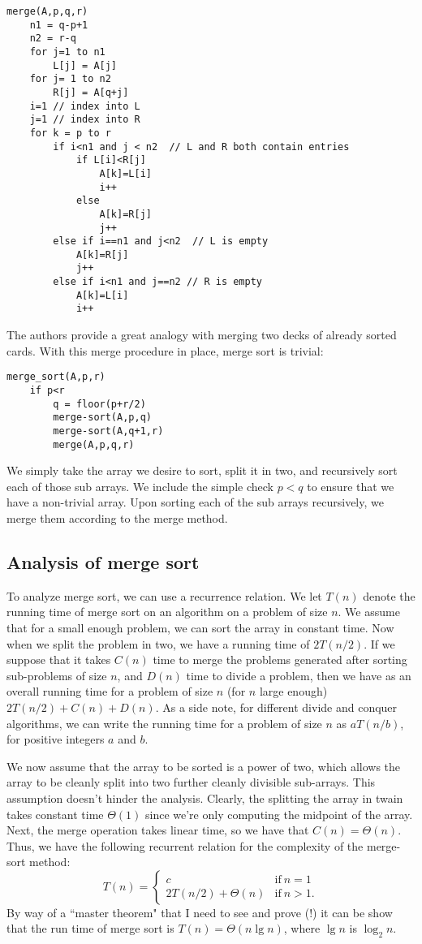 \documentclass[12pt,english]{article}
\begin{document}
\begin{lstlisting}
merge(A,p,q,r)
	n1 = q-p+1
	n2 = r-q
	for j=1 to n1
		L[j] = A[j]
	for j= 1 to n2
		R[j] = A[q+j]
	i=1 // index into L
	j=1 // index into R
	for k = p to r
		if i<n1 and j < n2  // L and R both contain entries
			if L[i]<R[j] 
				A[k]=L[i]
				i++
			else
				A[k]=R[j]
				j++
		else if i==n1 and j<n2  // L is empty
			A[k]=R[j]
			j++
		else if i<n1 and j==n2 // R is empty
			A[k]=L[i]
			i++
\end{lstlisting}

The authors \cite{CoStRiLe:2001} provide a great analogy with merging two decks of already sorted cards.  With this merge procedure in place, merge sort is trivial:

\begin{lstlisting}
merge_sort(A,p,r)
	if p<r
		q = floor(p+r/2)
		merge-sort(A,p,q)
		merge-sort(A,q+1,r)
		merge(A,p,q,r)
\end{lstlisting}

We simply take the array we desire to sort, split it in two, and recursively sort each of those sub arrays.  We include the simple check $p<q$ to ensure that we have a non-trivial array. Upon sorting each of the sub arrays recursively, we merge them according to the merge method.  

\subsection{Analysis of merge sort}

To analyze merge sort, we can use a recurrence relation.  We let $T(n)$ denote the running time of merge sort on an algorithm on a problem of size $n$.  We assume that for a small enough problem, we can sort the array in constant time.   Now when we split the problem in two, we have a running time of $2T(n/2)$.  If we suppose that it takes $C(n)$ time to merge the problems generated after sorting sub-problems of size $n$, and $D(n)$ time to divide a problem, then we have as an overall running time for a problem of size $n$ (for $n$ large enough) $2T(n/2) + C(n) + D(n)$.  As a side note, for different divide and conquer algorithms, we can write the running time for a problem of size $n$ as $aT(n/b)$, for positive integers $a$ and $b$.

We now assume that the array to be sorted is a power of two, which allows the array to be cleanly split into two further cleanly divisible sub-arrays.  This assumption doesn't hinder the analysis.  Clearly, the splitting the array in twain takes constant time $\Theta(1)$ since we're only computing the midpoint of the array.  Next, the merge operation takes linear time, so we have that $C(n) = \Theta(n)$.  Thus, we have the following recurrent relation for the complexity of the merge-sort method:
$$
T(n) = 
\left\{
\begin{array}{cc}
c				& 	\text{if}~n=1 \\
2T(n/2) + \Theta(n)	&	\text{if}~n>1.
\end{array}
\right.
$$
By way of a ``master theorem" that I need to see and prove (!) it can be show that the run time of merge sort is $T(n) = \Theta(n \lg n)$, where $\lg n$ is $\log_2 n$.

{}

\end{document}
